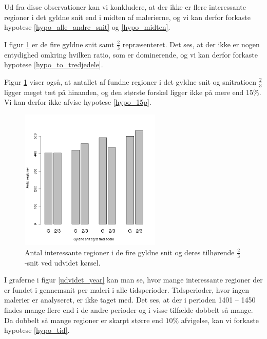 {Ud fra disse observationer kan vi konkludere, at der ikke er flere
interessante regioner i det gyldne snit end i midten af malerierne, og
vi kan derfor forkaste hypotese \ref{hypo_alle_andre_snit} og
\ref{hypo_midten}.

I figur \ref{G_vs_to_trejedele_udvidet} er de fire gyldne snit samt
$\frac{2}{3}$ repræsenteret. Det ses, at der ikke er nogen entydighed
omkring hvilken ratio, som er dominerende, og vi kan derfor forkaste hypotese
\ref{hypo_to_tredjedele}.

Figur \ref{G_vs_to_trejedele_udvidet} viser også, at antallet af fundne
regioner i det gyldne snit og snitratioen $\frac{2}{3}$ ligger meget
tæt på hinanden, og den største forskel ligger ikke på mere end $15\%$.
Vi kan derfor ikke afvise hypotese \ref{hypo_15p}.

\begin{figure}[h!]
	\begin{center}
		\includegraphics[width=0.6\textwidth]{afsnit/resultater/billeder/G_vs_to_tredjedeleU.png}
	\end{center}
    \caption{Antal interessante regioner i de fire gyldne snit og deres
    tilhørende $\frac{2}{3}$-snit ved udvidet kørsel.}
	\label{G_vs_to_trejedele_udvidet}
\end{figure}

I graferne i figur \ref{udvidet_year} kan man se, hvor mange
interessante regioner der er fundet i gennemsnit per maleri i alle
tidsperioder.  Tidsperioder, hvor ingen malerier er analyseret, er ikke
taget med. Det ses, at der i perioden 1401 -- 1450 findes mange flere
end i de andre perioder og i visse tilfælde dobbelt så mange. Da
dobbelt så mange regioner er skarpt større end $10\%$ afvigelse, kan vi
forkaste hypotese \ref{hypo_tid}.

}
